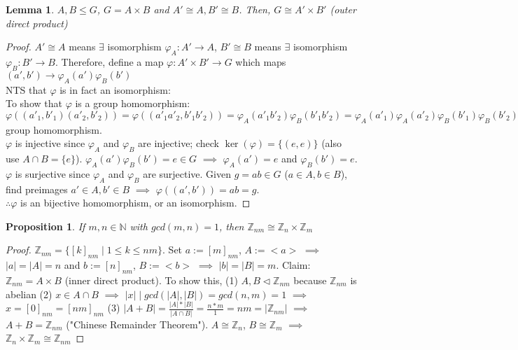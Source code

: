 \documentclass[11pt]{article}
\newtheorem{prop}[thm]{Proposition}
\newtheorem{lem}[thm]{Lemma}
\theoremstyle{definition}
\numberwithin{equation}{section}
\newcommand{\Z}{\mathbb{Z}}
\newcommand{\N}{\mathbb{N}} %
\begin{document}
\begin{lem}
$A, B \leq G$, $G = A \times B$ and $A' \cong A, B' \cong B$. Then, $G \cong A' \times B'$ (outer direct product)
\end{lem}
\begin{proof}
$A' \cong A$ means $\exists$ isomorphism $\varphi_A : A' \rightarrow A$, $B' \cong B$ means $\exists$ isomorphism $\varphi_B : B' \rightarrow B$. Therefore, define a map $\varphi: A' \times B' \rightarrow G$ which maps $(a', b') \rightarrow \varphi_{A}(a')\varphi_{B}(b')$\\
NTS that $\varphi$ is in fact an isomorphism:\\
To show that $\varphi$ is a group homomorphism: $\varphi((a'_{1}, b'_{1})(a'_{2},b'_{2})) = \varphi((a'_{1}a'_{2},b'_{1}b'_{2})) = \varphi_{A}(a'_{1}b'_{2})\varphi_{B}(b'_{1}b'_{2}) = \varphi_{A}(a'_{1})\varphi_{A}(a'_{2})\varphi_{B}(b'_{1})\varphi_{B}(b'_{2}) = \varphi_{A}(a'_{1})\varphi_{B}(b'_{1})\varphi_{A}(a'_{2})\varphi_{B}(b'_{2}) = \varphi((a'_{1},b'_{1})\varphi((a'_{2},b'_{2}) \leadsto$ group homomorphism.\\
$\varphi$ is injective since $\varphi_{A}$ and $\varphi_{B}$ are injective; check $\ker(\varphi) = \{(e, e)\}$ (also use $A \cap B = \{e\}$). $\varphi_{A}(a')\varphi_{B}(b') = e \in G$ $\implies$ $\varphi_{A}(a') = e$ and $\varphi_{B}(b') = e$.\\
$\varphi$ is surjective since $\varphi_{A}$ and $\varphi_{B}$ are surjective. Given $g = ab \in G$ ($a \in A, b \in B$), find preimages $a' \in A, b' \in B$ $\implies$ $\varphi((a', b')) = ab = g$.\\
$ \therefore \varphi$ is an bijective homomorphism, or an isomorphism.
\end{proof}
\begin{prop}
If $m , n \in \N$ with $gcd(m ,n) = 1$, then $\Z_{nm} \cong \Z_n \times \Z_m$
\end{prop}
\begin{proof}
$\Z_{nm} = \{[k]_{nm} \mid 1 \leq k \leq nm \}$. Set $a := [m]_{nm}$, $A :=<a>$ $\implies$ $|a| = |A| = n$ and $b := [n]_{nm}$, $B := <b>$ $\implies$ $|b| = |B| = m$. Claim: $\Z_{nm} = A \times B$ (inner direct product). To show this, (1) $A, B \vartriangleleft \Z_{nm}$ because $\Z_{nm}$ is abelian (2) $x \in A \cap B$ $\implies$ $|x| \mid gcd(|A|, |B|) = gcd(n, m) = 1$ $\implies$ $x = [0]_{nm} = [nm]_{nm}$ (3) $|A + B| = \frac{|A|*|B|}{|A \cap B|} = \frac{n * m}{1} = nm = |\Z_{nm}|$ $\implies$ $A + B = \Z_{nm}$ ("Chinese Remainder Theorem"). $A \cong \Z_{n}$, $B \cong \Z_{m}$ $\implies$ $\Z_n \times \Z_m \cong \Z_{nm}$
\end{proof}
\end{document}
